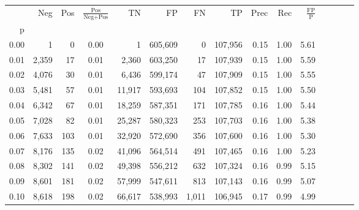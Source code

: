 \begin{tabular}{rrrcrrrrrrrrrrr}
\toprule
{} &    Neg &    Pos & $\frac{\text{Pos}}{\text{Neg}+\text{Pos}}$ &       TN &       FP &       FN &       TP &  Prec &   Rec & $\frac{\text{FP}}{\text{P}}$ \\
p    &        &        &                                            &          &          &          &          &       &       &                              \\
\midrule
0.00 &      1 &      0 &                                       0.00 &        1 &  605,609 &        0 &  107,956 &  0.15 &  1.00 &                         5.61 \\
0.01 &  2,359 &     17 &                                       0.01 &    2,360 &  603,250 &       17 &  107,939 &  0.15 &  1.00 &                         5.59 \\
0.02 &  4,076 &     30 &                                       0.01 &    6,436 &  599,174 &       47 &  107,909 &  0.15 &  1.00 &                         5.55 \\
0.03 &  5,481 &     57 &                                       0.01 &   11,917 &  593,693 &      104 &  107,852 &  0.15 &  1.00 &                         5.50 \\
0.04 &  6,342 &     67 &                                       0.01 &   18,259 &  587,351 &      171 &  107,785 &  0.16 &  1.00 &                         5.44 \\
0.05 &  7,028 &     82 &                                       0.01 &   25,287 &  580,323 &      253 &  107,703 &  0.16 &  1.00 &                         5.38 \\
0.06 &  7,633 &    103 &                                       0.01 &   32,920 &  572,690 &      356 &  107,600 &  0.16 &  1.00 &                         5.30 \\
0.07 &  8,176 &    135 &                                       0.02 &   41,096 &  564,514 &      491 &  107,465 &  0.16 &  1.00 &                         5.23 \\
0.08 &  8,302 &    141 &                                       0.02 &   49,398 &  556,212 &      632 &  107,324 &  0.16 &  0.99 &                         5.15 \\
0.09 &  8,601 &    181 &                                       0.02 &   57,999 &  547,611 &      813 &  107,143 &  0.16 &  0.99 &                         5.07 \\
0.10 &  8,618 &    198 &                                       0.02 &   66,617 &  538,993 &    1,011 &  106,945 &  0.17 &  0.99 &                         4.99 \\

\end{tabular}
